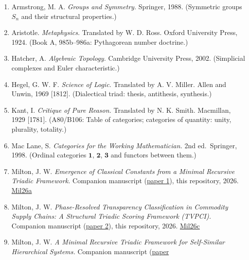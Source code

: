 \documentclass[12pt]{article}
\providecommand{\tightlist}{%
  \setlength{\itemsep}{0pt}\setlength{\parskip}{0pt}}
\begin{document}
\begin{enumerate}
\def\labelenumi{\arabic{enumi}.}
\tightlist
\item
  Armstrong, M. A. \emph{Groups and Symmetry.} Springer, 1988.
  (Symmetric groups \(S_n\) and their structural properties.)
\item
  Aristotle. \emph{Metaphysics.} Translated by W. D. Ross. Oxford
  University Press, 1924. (Book A, 985b--986a: Pythagorean number
  doctrine.)
\item
  Hatcher, A. \emph{Algebraic Topology.} Cambridge University Press,
  2002. (Simplicial complexes and Euler characteristic.)
\item
  Hegel, G. W. F. \emph{Science of Logic.} Translated by A. V. Miller.
  Allen and Unwin, 1969 {[}1812{]}. (Dialectical triad: thesis,
  antithesis, synthesis.)
\item
  Kant, I. \emph{Critique of Pure Reason.} Translated by N. K. Smith.
  Macmillan, 1929 {[}1781{]}. (A80/B106: Table of categories; categories
  of quantity: unity, plurality, totality.)
\item
  Mac Lane, S. \emph{Categories for the Working Mathematician.} 2nd
  ed.~Springer, 1998. (Ordinal categories \(\mathbf{1}\),
  \(\mathbf{2}\), \(\mathbf{3}\) and functors between them.)
\item
  Milton, J. W. \emph{Emergence of Classical Constants from a Minimal
  Recursive Triadic Framework.} Companion manuscript
  (\href{https://github.com/baardev/truevalue/blob/main/docnav/Research/papers/1_recursive-tholonic-five-constants/1_recursive-tholonic-five-constants.pdf}{paper
  1}), this repository, 2026.
  \href{https://github.com/baardev/truevalue/blob/main/docnav/Research/papers/1_recursive-tholonic-five-constants/1_recursive-tholonic-five-constants.pdf}{Mil26a}
\item
  Milton, J. W. \emph{Phase-Resolved Transparency Classification in
  Commodity Supply Chains: A Structural Triadic Scoring Framework
  (TVPCI).} Companion manuscript
  (\href{https://github.com/baardev/truevalue/blob/main/docnav/Research/papers/2_supply-chain-transparency-tvpci/2_supply-chain-transparency-tvpci.pdf}{paper
  2}), this repository, 2026.
  \href{https://github.com/baardev/truevalue/blob/main/docnav/Research/papers/2_supply-chain-transparency-tvpci/2_supply-chain-transparency-tvpci.pdf}{Mil26c}
\item
  Milton, J. W. \emph{A Minimal Recursive Triadic Framework for
  Self-Similar Hierarchical Systems.} Companion manuscript
  (\href{https://github.com/baardev/truevalue/blob/main/docnav/Research/papers/3_minimal-recursive-triadic-framework/3_minimal-recursive-triadic-framework.pdf}{paper
}
\end{enumerate}
\end{document}
